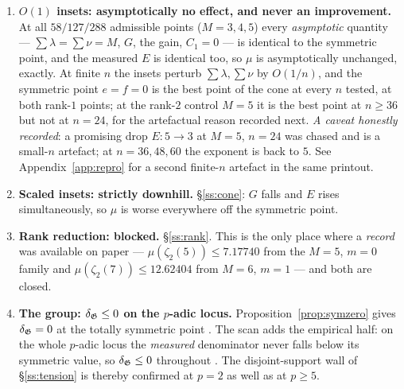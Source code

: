 \begin{enumerate}[label=\textup{(\roman*)},leftmargin=2.6em,itemsep=4pt]
\item \textbf{$O(1)$ insets: asymptotically no effect, and never an improvement.} At all
      $58/127/288$ admissible points ($M=3,4,5$) every \emph{asymptotic} quantity ---
      $\sum\lambda=\sum\nu=M$, $G$, the gain, $C_1=0$ --- is identical to the symmetric
      point, and the measured $E$ is identical too, so $\mu$ is asymptotically unchanged,
      exactly. At finite $n$ the insets perturb $\sum\lambda,\sum\nu$ by $O(1/n)$, and the
      symmetric point $e=f=0$ is the best point of the cone at every $n$ tested, at both
      rank-$1$ points; at the rank-$2$ control $M=5$ it is the best point at $n\ge36$ but
      not at $n=24$, for the artefactual reason recorded next.
      \emph{A caveat honestly recorded}: a promising drop $E:5\to3$ at $M=5$, $n=24$ was
      chased and is a small-$n$ artefact; at $n=36,48,60$ the exponent is back to $5$.
      See Appendix~\ref{app:repro} for a second finite-$n$ artefact in the same printout.

\item \textbf{Scaled insets: strictly downhill.} \S\ref{ss:cone}: $G$ falls and $E$ rises
      simultaneously, so $\mu$ is worse everywhere off the symmetric point.

\item \textbf{Rank reduction: blocked.} \S\ref{ss:rank}. This is the only place where a
      \emph{record} was available on paper --- $\mu(\zeta_2(5))\le7.17740$ from the $M=5$,
      $m=0$ family and $\mu(\zeta_2(7))\le12.62404$ from $M=6$, $m=1$ --- and both are closed.

\item \textbf{The group: $\delta_{\mathfrak{G}}\le0$ on the $p$-adic locus.} Proposition~\ref{prop:symzero}
      gives $\delta_{\mathfrak{G}}=0$ at the totally symmetric point \PROVED{}. The scan adds the empirical
      half: on the whole $p$-adic locus the \emph{measured} denominator never falls below
      its symmetric value, so $\delta_{\mathfrak{G}}\le0$ throughout . The
      disjoint-support wall of \S\ref{ss:tension} is thereby confirmed at $p=2$ as well as at
      $p\ge5$.
\end{enumerate}


